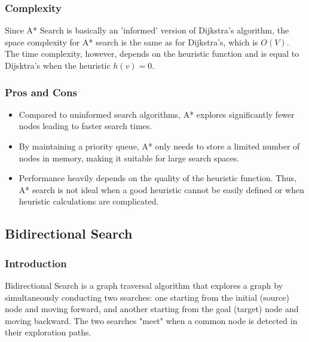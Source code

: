 		\subsubsection{Complexity}
		Since A* Search is basically an 'informed' version of Dijkstra's algorithm, the space complexity for A* search is the same as for Dijkstra's, which is $O(V)$.
		The time complexity, however, depends on the heuristic function and is equal to Dijsktra's when the heuristic $h(v) = 0$.
		\subsubsection{Pros and Cons}
			\begin{itemize}
				\item Compared to uninformed search algorithms, A* explores significantly fewer nodes leading to faster search times. 
				\item By maintaining a priority queue, A* only needs to store a limited number of nodes in memory, making it suitable for large search spaces.
				\item Performance heavily depends on the quality of the heuristic function. Thus, A* search is not ideal when a good heuristic cannot be easily defined or when heuristic calculations are complicated.
			\end{itemize}
	\subsection{Bidirectional Search}
		\subsubsection{Introduction}
			Bidirectional Search is a graph traversal algorithm that explores a graph by simultaneously conducting two searches: one starting from the initial (source) node and moving forward, and another starting from the goal (target) node and moving backward. The two searches "meet" when a common node is detected in their exploration paths.
